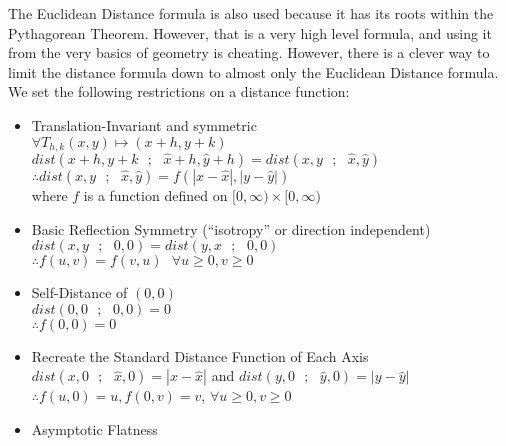 \documentclass [12 pt, twoside] {book}
\newcommand\+{\text{ }}
\begin{document}
The Euclidean Distance formula is also used because it has its roots within the
Pythagorean Theorem. However, that is a very high level formula, and using it
from the very basics of geometry is cheating. However, there is a clever way to
limit the distance formula down to almost only the Euclidean Distance formula.
We set the following restrictions on a distance function:
\begin{itemize}
    \item Translation-Invariant and symmetric\\
        $\forall T_{h, k} (x, y) \mapsto (x + h, y + k)$\\
        $dist(x + h, y + k\+;\+\hat{x} + h, \hat{y} + h) = dist(x, y \+;\+
        \hat{x}, \hat{y})$\\
        $\therefore dist(x, y \+;\+ \hat{x}, \hat{y}) = f(|x - \hat{x}|, |y -
        \hat{y}|)$\\
        where $f$ is a function defined on $[0, \infty)\times[0, \infty)$
    \item Basic Reflection Symmetry (``isotropy'' or direction independent)\\
        $dist(x, y\+;\+ 0, 0) = dist(y, x\+;\+ 0, 0)$\\
        $\therefore f(u, v) = f(v, u) \+\forall u\geq 0, v \geq 0$
    \item Self-Distance of $(0, 0)$\\
        $dist(0, 0 \+;\+ 0, 0) = 0$\\
        $\therefore f(0, 0) = 0$
    \item Recreate the Standard Distance Function of Each Axis\\
        $dist(x, 0\+;\+\hat{x}, 0) = |x - \hat{x}|$ and $dist(y, 0\+;\+\hat{y},
        0) = |y - \hat{y}|$\\
        $\therefore f(u, 0) = u, f(0, v) = v$, $\forall u \geq 0, v \geq 0$
    \item Asymptotic Flatness
        \begin{figure}[ht]
\end{figure}
\end{itemize}
\end{document}
